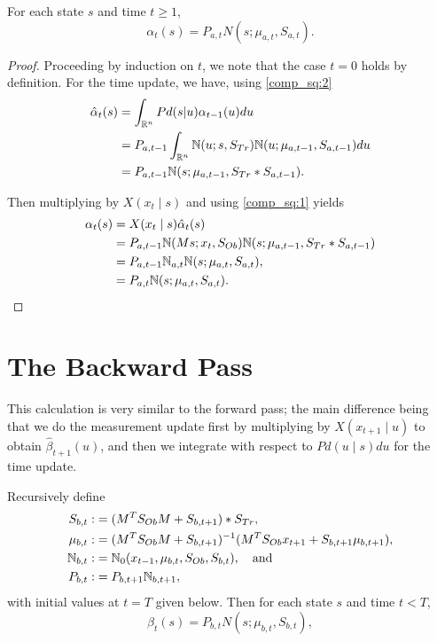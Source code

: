 \documentclass[12pt,leqno]{article}
\begin{document}
\begin{Thm}\label{alpha:1}
  For each state $s$ and time $t \ge 1$,
$$
  \alpha_t(s) = P_{a,t}N(s;\mu_{a,t},S_{a,t}).
$$
\end{Thm}

\begin{proof}

Proceeding by induction on $t$, we note that the case $t = 0$ holds by definition.
For the time update, we have, using \eqref{comp_sq:2}
\begin{align}
  \hat{\alpha}_t(s) &= \int_{{\mathbb R}^n}Pd(s|u)\alpha_{t-1}(u)du \\\notag
 &= P_{a,t-1}\int_{{\mathbb R}^n}{\mathbb N}(u;s,S_{Tr}){\mathbb N}(u;\mu_{a,t-1},S_{a,t-1})du \notag\\
 &= P_{a,t-1}{\mathbb N}(s;\mu_{a,t-1},S_{Tr}*S_{a,t-1}).
\end{align}

Then multiplying by $X(x_t\mid s)$ and using \eqref{comp_sq:1} yields
\begin{align*}
  \alpha_t(s) &= X(x_t\mid s)\hat{\alpha}_t(s) \\
  &= P_{a,t-1}{\mathbb N}(Ms;x_t,S_{Ob}){\mathbb N}(s;\mu_{a,t-1},S_{Tr}*S_{a,t-1}) \\
  &= P_{a,t-1}{\mathbb N}_{a,t}{\mathbb N}(s;\mu_{a,t},S_{a,t}), \\
  &= P_{a,t}{\mathbb N}(s;\mu_{a,t},S_{a,t}).
\end{align*}
\end{proof}

\section{The Backward Pass}
This calculation is very similar to the forward pass; the main difference being that we do
the measurement update first by multiplying by $X(x_{t+1}\mid u)$ to obtain $\hat{\beta}_{t+1}(u)$,
and then we integrate with respect to $Pd(u\mid s)du$ for the time update.  

\begin{Thm}\label{beta:1}
  Recursively define
\begin{align*}
  S_{b,t} :&= (M^TS_{Ob}M + S_{b,t+1})*S_{Tr},\\
  \mu_{b,t} :&= (M^TS_{Ob}M + S_{b,t+1})^{-1}(M^TS_{Ob}x_{t+1} + S_{b,t+1}\mu_{b,t+1}),\\
  {\mathbb N}_{b,t} :&= {\mathbb N}_0(x_{t-1},\mu_{b,t},S_{Ob},S_{b,t}),\quad\text{and}\\
  P_{b,t}:&=P_{b,t+1}{\mathbb N}_{b,t+1},
\end{align*}
with initial values at $t = T$ given below. Then for each state $s$ and time $t < T$,
$$
  \beta_t(s) = P_{b,t}N(s;\mu_{b,t},S_{b,t}),
$$
\end{Thm}
\end{document}
